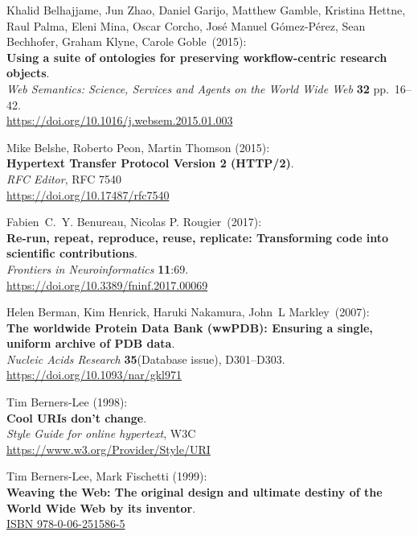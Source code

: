 \begin{thebibliography}{9}
Khalid Belhajjame, Jun Zhao, Daniel Garijo, Matthew Gamble,
Kristina Hettne, Raul Palma, Eleni Mina, Oscar Corcho, José Manuel
Gómez-Pérez, Sean Bechhofer, Graham Klyne, Carole Goble~(2015):\\
\textbf{Using a suite of ontologies for preserving workflow-centric
research objects}.\\
\emph{Web Semantics: Science, Services and Agents on the World Wide Web}
\textbf{32} pp.~16--42.\\
\url{https://doi.org/10.1016/j.websem.2015.01.003}

Mike Belshe, Roberto Peon, Martin Thomson (2015): \\
\textbf{Hypertext Transfer Protocol Version 2 (HTTP/2)}.\\
\emph{RFC Editor}, RFC 7540\\
\url{https://doi.org/10.17487/rfc7540}

Fabien~C.~Y. Benureau, Nicolas P. Rougier~(2017):\\
\textbf{Re-run, repeat, reproduce, reuse, replicate: Transforming code
into scientific contributions}.\\
\emph{Frontiers in Neuroinformatics} \textbf{11}:69.\\
\url{https://doi.org/10.3389/fninf.2017.00069}

Helen Berman, Kim Henrick, Haruki Nakamura, John~L Markley~(2007):\\
\textbf{The worldwide Protein Data Bank (wwPDB): Ensuring a single,
uniform archive of PDB data}.\\
\emph{Nucleic Acids Research} \textbf{35}(Database issue),
D301--D303.\\
\url{https://doi.org/10.1093/nar/gkl971}

Tim Berners-Lee (1998): \\
\textbf{Cool {URIs} don't change}. \\
\emph{Style Guide for online hypertext}, W3C \\
\url{https://www.w3.org/Provider/Style/URI} 

Tim Berners-Lee, Mark Fischetti (1999): \\
\textbf{Weaving the {Web}: The original design and ultimate destiny of the {World Wide Web} by its
inventor}.\\
\href{https://identifiers.org/isbn/9780062515865}{ISBN 978-0-06-251586-5}


\end{thebibliography}
